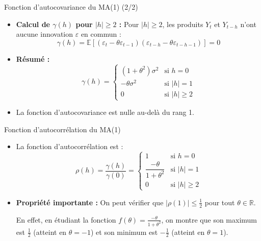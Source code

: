 \documentclass[11pt,aspectratio=169]{beamer}
\newcommand{\E}{\mathbb{E}}
\newcommand{\R}{\mathbb{R}}
\begin{document}
\begin{frame}{Fonction d'autocovariance du MA(1) (2/2)}

\begin{itemize}

\item \textbf{Calcul de $\gamma(h)$ pour $|h| \geq 2$ :}
Pour $|h| \geq 2$, les produits $Y_t$ et $Y_{t-h}$ n'ont aucune innovation $\varepsilon$ en commun :
\[
\gamma(h) = \E[(\varepsilon_t - \theta \varepsilon_{t-1})(\varepsilon_{t-h} - \theta \varepsilon_{t-h-1})] = 0
\]

\item \textbf{Résumé :} \[
\gamma(h) = \begin{cases}
(1 + \theta^2) \sigma^2 & \text{si } h = 0 \\
-\theta \sigma^2 & \text{si } |h| = 1 \\
0 & \text{si } |h| \geq 2
\end{cases}
\]

\item La fonction d'autocovariance est nulle au-delà du rang 1.

\end{itemize}
\end{frame}

\begin{frame}{Fonction d'autocorrélation du MA(1)}

\begin{itemize}

\item La fonction d'autocorrélation est :
\[
\rho(h) = \frac{\gamma(h)}{\gamma(0)} = \begin{cases}
1 & \text{si } h = 0 \\[0.2cm]
\dfrac{-\theta}{1 + \theta^2} & \text{si } |h| = 1 \\[0.3cm]
0 & \text{si } |h| \geq 2
\end{cases}
\]

\item \textbf{Propriété importante :} On peut vérifier que $|\rho(1)| \leq \frac{1}{2}$ pour tout $\theta \in \R$.

En effet, en étudiant la fonction $f(\theta) = \frac{-\theta}{1+\theta^2}$, on montre que son maximum est $\frac{1}{2}$ (atteint en $\theta = -1$) et son minimum est $-\frac{1}{2}$ (atteint en $\theta = 1$).

\end{itemize}
\end{frame}
\end{document}
